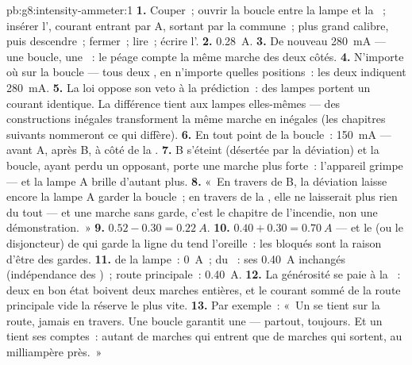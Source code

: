 \begin{solution}{pb:g8:intensity-ammeter:1}
\textbf{1.} Couper~; ouvrir la boucle entre la lampe et la ~;
insérer l', courant entrant par \unit{A}, sortant par la
commune~; plus grand calibre, puis descendre~; fermer~; lire~;
écrire l'.
\textbf{2.} \qty{0.28}{A}.
\textbf{3.} De nouveau \qty{280}{mA} --- une boucle, une ~:
le péage compte la même marche des deux côtés.
\textbf{4.} N'importe où sur la boucle --- tous deux , en
n'importe quelles positions~: les deux indiquent \qty{280}{mA}.
\textbf{5.} La loi oppose son veto à la prédiction~: des lampes  portent un courant identique. La différence tient aux lampes
elles-mêmes --- des constructions inégales transforment la même
marche en  inégales (les chapitres suivants nommeront ce qui
diffère).
\textbf{6.} En tout point de la boucle~: \qty{150}{mA} --- avant A,
après B, à côté de la .
\textbf{7.} B s'éteint (désertée par la déviation) et la boucle,
ayant perdu un opposant, porte une marche plus forte~: l'appareil
grimpe --- et la lampe A brille d'autant plus.
\textbf{8.} «~En travers de B, la déviation laisse encore la lampe A
garder la boucle~; en travers de la , elle ne laisserait plus
rien du tout --- et une marche sans garde, c'est le chapitre de
l'incendie, non une démonstration.~»
\textbf{9.} $0.52 - 0.30 = \qty{0.22}{A}$.
\textbf{10.} $0.40 + 0.30 = \qty{0.70}{A}$ --- et le  (ou le
disjoncteur) de  qui garde la ligne du  tend l'oreille~:
les  bloqués sont la raison d'être des gardes.
\textbf{11.}  de la lampe~: \qty{0}{A}~;  du ~:
ses \qty{0.40}{A} inchangés (indépendance des  )~; route principale~: \qty{0.40}{A}.
\textbf{12.} La générosité se paie à la ~: deux  en bon
état boivent deux marches entières, et le courant sommé de la route
principale vide la réserve le plus vite.
\textbf{13.} Par exemple~: «~Un  se tient sur la route,
jamais en travers. Une boucle garantit une  --- partout,
toujours. Et un  tient ses comptes~: autant de marches qui
entrent que de marches qui sortent, au milliampère près.~»
\end{solution}
